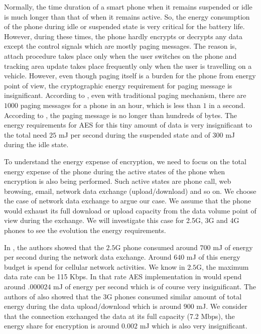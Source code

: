 \documentclass[lnicst,sechang,a4paper]{svmultln}
\begin{document}
Normally, the time duration of a smart phone when it remains suspended or idle is much longer than that of when it remains active. So, the energy consumption of the phone during idle or suspended state is very critical for the battery life. However, during these times, the phone hardly encrypts or decrypts any data except the control signals which are mostly paging messages. The reason is, attach procedure takes place only when the user switches on the phone and tracking area update takes place frequently only when the user is travelling on a vehicle. However, even though paging itself is a burden for the phone from energy point of view, the cryptographic energy requirement for paging message is insignificant. According to \cite{Nokia_2013}, even with traditional paging mechanism, there are $1000$ paging messages for a phone in an hour, which is less than $1$ in a second. According to \cite{3GPP_TS_36_331}, the paging message is no longer than hundreds of bytes. The energy requirements for AES for this tiny amount of data is very insignificant to the total need $25$ mJ per second during the suspended state and of 300 mJ during the idle state.

To understand the energy expense of encryption, we need to focus on the total energy expense of the phone during the active states of the phone when encryption is also being performed. Such active states are phone call, web browsing, email, network data exchange (upload/download) and so on. We choose the case of network data exchange to argue our case. We assume that the phone would exhaust its full download or upload capacity from the data volume point of view during the exchange. We will investigate this case for 2.5G, 3G and 4G phones to see the evolution the energy requirements.

In \cite{Usenix_2010}, the authors showed that the $2.5$G phone consumed around $700$ mJ of energy per second during the network data exchange. Around $640$ mJ of this energy budget is spend for cellular network activities. We know in $2.5$G, the maximum data rate can be 115 Kbps. In that rate AES implementation in \cite{Ruhr_2011} would spend around $.000024$ mJ of energy per second which is of course very insignificant. The authors of \cite{Usenix_2010} also showed that the 3G phones consumed similar amount of total energy during the data upload/download which is around $900$ mJ. We consider that the connection exchanged the data at its full capacity (7.2 Mbps), the energy share for encryption is around $0.002$ mJ which is also very insignificant. 
\end{document}
